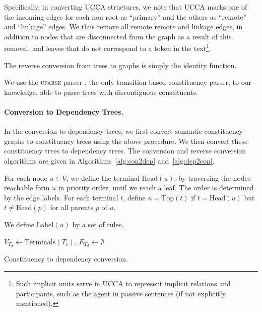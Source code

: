 \documentclass[11pt]{article}
\begin{document}
Specifically, in converting UCCA structures, we note that UCCA marks one of the incoming edges
for each non-root as ``primary'' and the others as ``remote'' and ``linkage'' edges.
We thus remove all remote remote and linkage edges, in addition to nodes that are disconnected
from the graph as a result of this removal, and leaves that do not correspond to a token in the
text\footnote{Such implicit units serve in UCCA to represent implicit relations and participants, such as
the agent in passive sentences (if not explicitly mentioned).}.

The reverse conversion from trees to graphs is simply the identity function.

We use the \textsc{uparse} parser \cite{maier2015discontinuous}, the only transition-based
constituency parser, to our knowledge, able to parse trees with discontiguous constituents.

\paragraph{Conversion to Dependency Trees.}\label{subsec:con2dep}
In the conversion to dependency trees, we first convert semantic constituency graphs to constituency trees using the above procedure. We then convert these constituency trees to dependency trees. The conversion and reverse conversion algorithms are given in Algorithms~\ref{alg:con2dep} and~\ref{alg:dep2con}.

For each node $u \in V$, we define the terminal $\mathrm{Head}(u)$, by traversing the nodes reachable form $u$ in priority order, until we reach a leaf. The order is determined by the edge labels.
For each terminal $t$, define $u=\mathrm{Top}(t)$ if $t=\mathrm{Head}(u)$ but $t\neq \mathrm{Head}(p)$ for all parents $p$ of $u$.

We define $\mathrm{Label}(u)$ by a set of rules.

\begin{algorithm}[t]
 $V_{T_d} \leftarrow \mathrm{Terminals}({T_c})$,
 $E_{T_d} \leftarrow \emptyset$\\
 \caption{Constituency to dependency conversion.}
 \label{alg:con2dep}
\end{algorithm}
\end{document}
